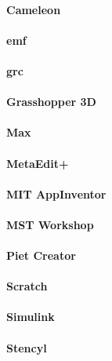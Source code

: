 \paragraph{Cameleon}

\paragraph{\acl{emf}}

\paragraph{\acl{grc}}

\paragraph{Grasshopper 3D }

\paragraph{Max}

\paragraph{MetaEdit+}

\paragraph{MIT AppInventor}

\paragraph{MST Workshop}

\paragraph{Piet Creator}

\paragraph{Scratch}

\paragraph{Simulink}

\paragraph{Stencyl}

